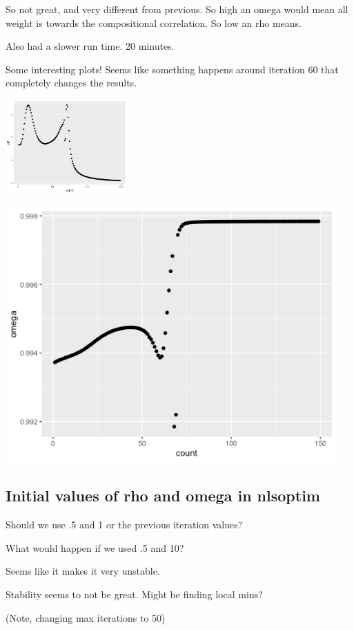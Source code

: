 \documentclass[10pt]{article}
\theoremstyle{definition}
\begin{document}
So not great, and very different from previous.
So high an omega would mean all weight is towards the compositional correlation. So low an rho means.

Also had a slower run time. 20 minutes.

Some interesting plots! Seems like something happens around iteration 60 that completely changes the results.

\includegraphics[width=0.35\textwidth]{img/Spring_2022_Journal-c6b97817.png}

\includegraphics[width=0.95\textwidth]{img/Spring_2022_Journal-8a414f07.png}


\subsection{Initial values of rho and omega in nlsoptim}

Should we use .5 and 1 or the previous iteration values?

What would happen if we used .5 and 10?

Seems like it makes it very unstable.

Stability seems to not be great. Might be finding local mins?

(Note, changing max iterations to 50)
\end{document}
